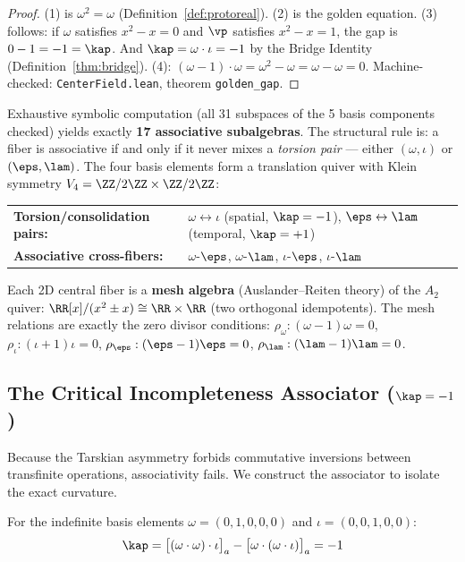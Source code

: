 \begin{proof}
(1) is $\omega^2 = \omega$ (Definition~\ref{def:protoreal}). (2) is the golden equation. (3) follows: if $\omega$ satisfies $x^2 - x = 0$ and $\vp$ satisfies $x^2 - x = 1$, the gap is $0 - 1 = -1 = \kap$. And $\kap = \omega \cdot \iota = -1$ by the Bridge Identity (Definition~\ref{thm:bridge}). (4): $(\omega - 1) \cdot \omega = \omega^2 - \omega = \omega - \omega = 0$. Machine-checked: \texttt{CenterField.lean}, theorem \texttt{golden\_gap}. \qedhere
\end{proof}

\begin{remark}\label{rem:fiber-lattice}
Exhaustive symbolic computation (all 31 subspaces of the 5 basis components checked) yields exactly \textbf{17 associative subalgebras}. The structural rule is: a fiber is associative if and only if it never mixes a \emph{torsion pair} --- either $(\omega, \iota)$ or $(\eps, \lam)$. The four basis elements form a translation quiver with Klein symmetry $V_4 = \ZZ/2\ZZ \times \ZZ/2\ZZ$:
\begin{center}
\begin{tabular}{ll}
\textbf{Torsion/consolidation pairs:} & $\omega \leftrightarrow \iota$ (spatial, $\kap = -1$), \quad $\eps \leftrightarrow \lam$ (temporal, $\kap = +1$) \\
\textbf{Associative cross-fibers:} & $\omega$-$\eps$, $\omega$-$\lam$, $\iota$-$\eps$, $\iota$-$\lam$
\end{tabular}
\end{center}
Each 2D central fiber is a \textbf{mesh algebra} (Auslander--Reiten theory) of the $A_2$ quiver: $\RR[x]/(x^2 \pm x) \cong \RR \times \RR$ (two orthogonal idempotents). The mesh relations are exactly the zero divisor conditions: $\rho_\omega : (\omega - 1)\omega = 0$, $\rho_\iota : (\iota + 1)\iota = 0$, $\rho_\eps : (\eps - 1)\eps = 0$, $\rho_\lam : (\lam - 1)\lam = 0$.
\end{remark}


\subsection{The Critical Incompleteness Associator ($\kap = -1$)}\label{sec:curvature}

Because the Tarskian asymmetry forbids commutative inversions between transfinite operations, associativity fails. We construct the associator to isolate the exact curvature.

\begin{theorem}\label{thm:associator}\label{thm:curvature}
For the indefinite basis elements $\omega = (0,1,0,0,0)$ and $\iota = (0,0,1,0,0)$:
$$\kap = \bigl[(\omega \cdot \omega) \cdot \iota\bigr]_a - \bigl[\omega \cdot (\omega \cdot \iota)\bigr]_a = -1$$
\end{theorem}


